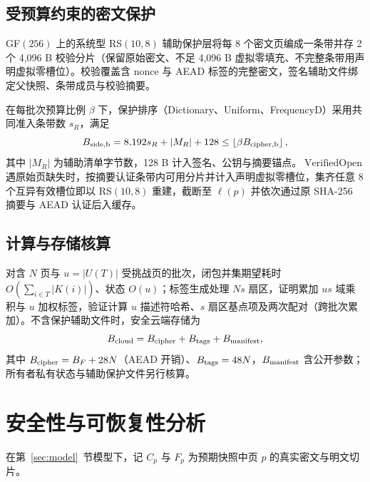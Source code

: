 \documentclass[10pt,journal]{IEEEtran}
\begin{document}
\subsection{受预算约束的密文保护}\label{sec:protection}
GF$(256)$ 上的系统型 RS$(10,8)$ 辅助保护层将每 8 个密文页编成一条带并存 2 个 4,096 B 校验分片（保留原始密文、不足 4,096 B 虚拟零填充、不完整条带用声明虚拟零槽位）。校验覆盖含 nonce 与 AEAD 标签的完整密文，签名辅助文件绑定父快照、条带成员与校验摘要。

在每批次预算比例 $\beta$ 下，保护排序（Dictionary、Uniform、FrequencyD）采用共同准入条带数 $s_R$，满足
\begin{equation}\label{eq:budget}
B_{\rm side,b}=8{,}192s_R+|M_R|+128\leq\left\lfloor\beta B_{\rm cipher,b}\right\rfloor,
\end{equation}
其中 $|M_R|$ 为辅助清单字节数，128 B 计入签名、公钥与摘要锚点。$\operatorname{VerifiedOpen}$ 遇原始页缺失时，按摘要认证条带内可用分片并计入声明虚拟零槽位，集齐任意 8 个互异有效槽位即以 RS$(10,8)$ 重建，截断至 $\ell(p)$ 并依次通过原 SHA-256 摘要与 AEAD 认证后入缓存。

\subsection{计算与存储核算}\label{sec:accounting}
对含 $N$ 页与 $u=|U(T)|$ 受挑战页的批次，闭包并集期望耗时 $O(\sum_{i\in T}|K(i)|)$、状态 $O(u)$；标签生成处理 $Ns$ 扇区，证明累加 $us$ 域乘积与 $u$ 加权标签，验证计算 $u$ 描述符哈希、$s$ 扇区基点项及两次配对（跨批次累加）。不含保护辅助文件时，安全云端存储为
\begin{equation}\label{eq:cloud-cost}
B_{\rm cloud}=B_{\rm cipher}+B_{\rm tags}+B_{\rm manifest},
\end{equation}
其中 $B_{\rm cipher}=B_F+28N$（AEAD 开销）、$B_{\rm tags}=48N$，$B_{\rm manifest}$ 含公开参数；所有者私有状态与辅助保护文件另行核算。

\section{安全性与可恢复性分析}\label{sec:security}
在第~\ref{sec:model}~节模型下，记 $C_p$ 与 $F_p$ 为预期快照中页 $p$ 的真实密文与明文切片。
\end{document}
